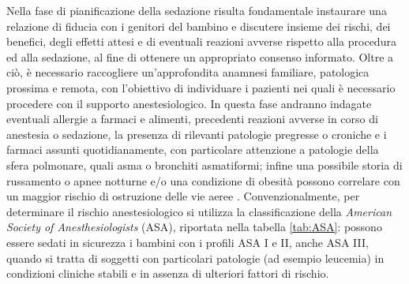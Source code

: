 Nella fase di pianificazione della sedazione risulta fondamentale instaurare una relazione di fiducia con i genitori del bambino e discutere insieme dei rischi, dei benefici, degli effetti attesi e di eventuali reazioni avverse rispetto alla procedura ed alla sedazione, al fine di ottenere un appropriato consenso informato. Oltre a ciò, è necessario raccogliere un'approfondita anamnesi familiare, patologica prossima e remota, con l'obiettivo di individuare i pazienti nei quali è necessario procedere con il supporto anestesiologico. In questa fase andranno indagate eventuali allergie a farmaci e alimenti, precedenti reazioni avverse in corso di anestesia o sedazione, la presenza di rilevanti patologie pregresse o croniche e i farmaci assunti quotidianamente, con particolare attenzione a patologie della sfera polmonare, quali asma o bronchiti asmatiformi; infine una possibile storia di russamento o apnee notturne e/o una condizione di obesità possono correlare con un maggior rischio di ostruzione delle vie aeree \cite{Simeupsedazione, Guidelines2019}.
Convenzionalmente, per determinare il rischio anestesiologico si utilizza la classificazione della \emph {American Society of Anesthesiologists} (ASA), riportata nella tabella \ref{tab:ASA}: possono essere sedati in sicurezza i bambini con i profili ASA I e II, anche ASA III, quando si tratta di soggetti con particolari patologie (ad esempio leucemia) in condizioni cliniche stabili e in assenza di ulteriori fattori di rischio. 

\bigskip

